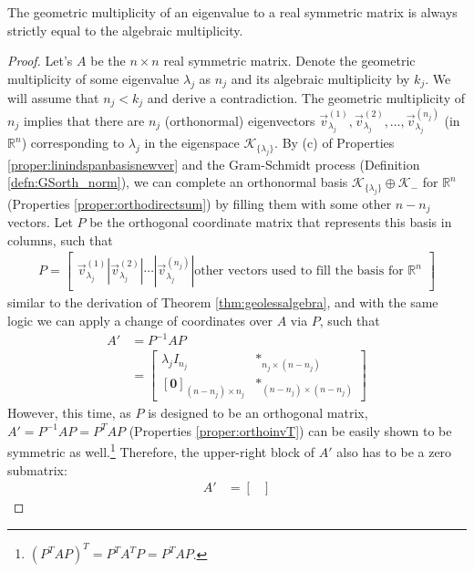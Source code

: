 \begin{proper}
\label{proper:symnodefic}
The geometric multiplicity of an eigenvalue to a real symmetric matrix is always strictly equal to the algebraic multiplicity.
\end{proper}
\begin{proof}
Let's $A$ be the $n \times n$ real symmetric matrix. Denote the geometric multiplicity of some eigenvalue $\lambda_j$ as $n_j$ and its algebraic multiplicity by $k_j$. We will assume that $n_j < k_j$ and derive a contradiction. The geometric multiplicity of $n_j$ implies that there are $n_j$ (orthonormal) eigenvectors $\vec{v}^{(1)}_{\lambda_j}, \vec{v}^{(2)}_{\lambda_j}, \ldots, \vec{v}^{(n_j)}_{\lambda_j}$ (in $\mathbb{R}^n$) corresponding to $\lambda_j$ in the eigenspace $\mathcal{K}_{\{\lambda_j\}}$. By (c) of Properties \ref{proper:linindspanbasisnewver} and the Gram-Schmidt process (Definition \ref{defn:GSorth_norm}), we can complete an orthonormal basis $\mathcal{K}_{\{\lambda_j\}} \oplus \mathcal{K}_{-}$ for $\mathbb{R}^n$ (Properties \ref{proper:orthodirectsum}) by filling them with some other $n-n_j$ vectors. Let $P$ be the orthogonal coordinate matrix that represents this basis in columns, such that
\begin{align*}
P = \begin{bmatrix}
\vec{v}^{(1)}_{\lambda_j} | \vec{v}^{(2)}_{\lambda_j} | \cdots | \vec{v}^{(n_j)}_{\lambda_j} | \text{other vectors used to fill the basis for $\mathbb{R}^n$}
\end{bmatrix}
\end{align*}
similar to the derivation of Theorem \ref{thm:geolessalgebra}, and with the same logic we can apply a change of coordinates over $A$ via $P$, such that
\begin{align*}
A' &= P^{-1}AP \\
&= \begin{bmatrix}
\lambda_j I_{n_j} & *_{n_j\times(n-n_j)} \\
[\textbf{0}]_{(n-n_j)\times n_j} & *_{(n-n_j)\times(n-n_j)}
\end{bmatrix}
\end{align*}
However, this time, as $P$ is designed to be an orthogonal matrix, $A' = P^{-1}AP = P^TAP$ (Properties \ref{proper:orthoinvT}) can be easily shown to be symmetric as well.\footnote{$(P^TAP)^T = P^TA^TP = P^TAP$.} Therefore, the upper-right block of $A'$ also has to be a zero submatrix:
\begin{align*}
A' &=  
\begin{bmatrix}

\end{bmatrix}
\end{align*}
\end{proof}
